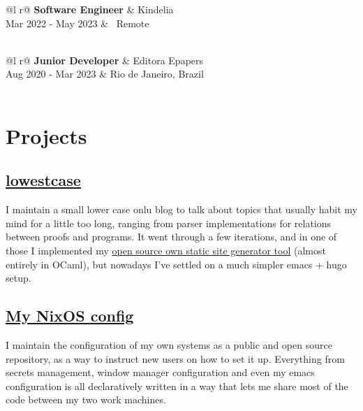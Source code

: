 \documentclass[twocolumn,a4paper,12pt]{article}
\begin{document}
\begin{tabularx}{\linewidth}{ @{}l r@{} }
  \textbf{Software Engineer} & Kindelia \\
  Mar 2022 - May 2023 & \faMapMarker* \ Remote \\
  \\
\end{tabularx}

\begin{tabularx}{\linewidth}{ @{}l r@{} }
  \textbf{Junior Developer} & Editora Epapers \\
  \hfill Aug 2020 - Mar 2023 & \faMapMarker* Rio de Janeiro, Brazil \\
  \\
\end{tabularx}

\section{Projects}

\subsection*{\href{https://o-santi.github.com}{\textbf{lowestcase}}}
  I maintain a small lower case onlu blog to talk about topics that usually habit my mind for a little too long, ranging from parser implementations for relations between proofs and programs. It went through a few iterations, and in one of those I implemented my \href{https://github.com/o-santi/sssg}{open source own static site generator tool} (almost entirely in OCaml), but nowadays I've settled on a much simpler emacs + hugo setup.

\subsection*{\href{https://github.com/o-santi/nixos}{\textbf{My NixOS config}}}
I maintain the configuration of my own systems as a public and open source repository, as a way to instruct new users on how to set it up. Everything from secrets management, window manager configuration and even my emacs configuration is all declaratively written in a way that lets me share most of the code between my two work machines.
\end{document}
